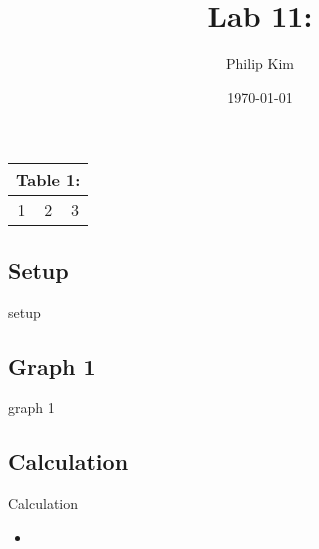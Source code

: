 \documentclass{article}
\title{Lab 11: }
\author{Philip Kim}
\date{\today}
\begin{document}
\maketitle
\vspace*{-1cm}
\begin{table}[!htp]\centering
  \begin{tabular}{|c|c|c|}\hline
    \multicolumn{3}{|c|}{\textbf{Table 1: }}\\\hline
    1&2&3\\\hline
  \end{tabular}
\end{table}
\begin{center}
  \subsection*{Setup}
  setup
  \subsection*{Graph 1}
  graph 1
  \subsection*{Calculation}
  Calculation
\end{center}
\begin{itemize}
  \item
\end{itemize}
\end{document}
